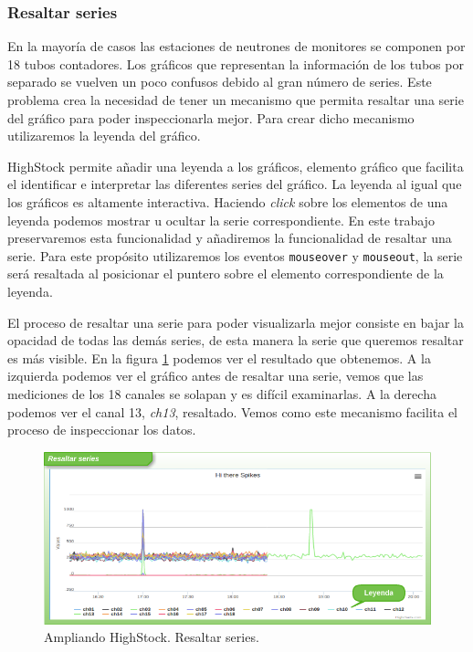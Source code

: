 		\subsubsection{Resaltar series}
			En la mayoría de casos las estaciones de neutrones de monitores se componen por 18 tubos contadores. Los gráficos que
			representan la información de los tubos por separado se vuelven un poco confusos debido al gran número de series. Este
			problema crea la necesidad de tener un mecanismo que permita resaltar una serie del gráfico para poder inspeccionarla mejor.
			Para crear dicho mecanismo utilizaremos la leyenda del gráfico.
			\par
			HighStock permite añadir una leyenda a los gráficos, elemento gráfico que facilita el identificar e interpretar las diferentes
			series del gráfico. La leyenda al igual que los gráficos es altamente interactiva. Haciendo \emph{click} sobre los elementos
			de una leyenda podemos mostrar u ocultar la serie correspondiente. En este trabajo preservaremos esta funcionalidad y
			añadiremos la funcionalidad de resaltar una serie. Para este propósito utilizaremos los eventos \texttt{mouseover} y
			\texttt{mouseout}, la serie será resaltada al posicionar el puntero sobre el elemento correspondiente de la leyenda. 
			\par
			El proceso de resaltar una serie para poder visualizarla mejor consiste en bajar la opacidad de todas las demás series, de
			esta manera la serie que queremos resaltar es más visible. En la figura \ref{fig:resalto} podemos ver el resultado que
			obtenemos. A la izquierda podemos ver el gráfico antes de resaltar una serie, vemos que las mediciones de los 18 canales se
			solapan y es difícil examinarlas. A la derecha podemos ver el canal 13, \emph{ch13}, resaltado. Vemos como este mecanismo
			facilita el proceso de inspeccionar los datos.
			\begin{figure}[h]
				\centering
				\includegraphics[keepaspectratio, width=1\textwidth]{./img/resalto.png}
				\caption{Ampliando HighStock. Resaltar series.}   
				\label{fig:resalto}
			\end{figure}
	
